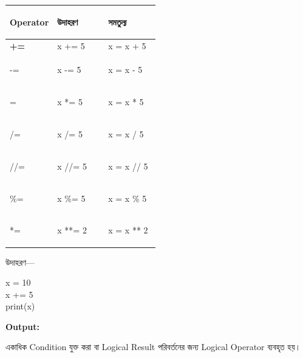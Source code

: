 \begin{tabularx}
{\linewidth}
{
|>{\bfseries\centering\arraybackslash}p{0.15\linewidth}
|>{\RaggedRight\arraybackslash}p{0.34\linewidth}
|Y|
}

\hline
{}

\textbf{Operator}
&
\textbf{উদাহরণ}
&
\textbf{সমতুল্য}
\\
\hline

\textenglish{\ttfamily +=}
&
\textenglish{\ttfamily x += 5}
&
\textenglish{\ttfamily x = x + 5}
\\
\hline

\textenglish{\ttfamily -=}
&
\textenglish{\ttfamily x -= 5}
&
\textenglish{\ttfamily x = x - 5}
\\
\hline

\textenglish{\ttfamily *=}
&
\textenglish{\ttfamily x *= 5}
&
\textenglish{\ttfamily x = x * 5}
\\
\hline

\textenglish{\ttfamily /=}
&
\textenglish{\ttfamily x /= 5}
&
\textenglish{\ttfamily x = x / 5}
\\
\hline

\textenglish{\ttfamily //=}
&
\textenglish{\ttfamily x //= 5}
&
\textenglish{\ttfamily x = x // 5}
\\
\hline

\textenglish{\ttfamily \%=}
&
\textenglish{\ttfamily x \%= 5}
&
\textenglish{\ttfamily x = x \% 5}
\\
\hline

\textenglish{\ttfamily **=}
&
\textenglish{\ttfamily x **= 2}
&
\textenglish{\ttfamily x = x ** 2}
\\
\hline

\end{tabularx}

উদাহরণ—

\begin{codebox}
\begin{english}
\ttfamily
x = 10\\
x += 5\\
print(x)
\end{english}
\end{codebox}

\textbf{Output:}
\textenglish{}



একাধিক Condition যুক্ত করা বা Logical Result পরিবর্তনের জন্য
Logical Operator ব্যবহৃত হয়।

